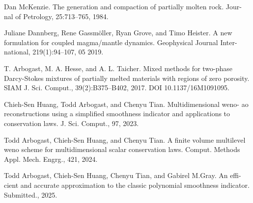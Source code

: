 \documentclass[usenames,dvipsnames,letterpaper,landscape,final]{slides}
\theoremstyle{definition}
\begin{document}
\begin{myslideNoFooter}
\small

		  \begin{nlist}

		  \item Dan McKenzie. The generation and compaction of partially molten rock. Jour-
nal of Petrology, 25:713–765, 1984.

					 \bigskip

		  \item Juliane Dannberg, Rene Gassmöller, Ryan Grove, and Timo Heister.
A new
formulation for coupled magma/mantle dynamics. Geophysical Journal Inter-
national, 219(1):94–107, 05 2019.

\bigskip
		  \item T. Arbogast, M. A. Hesse, and A. L. Taicher. Mixed methods for two-phase
Darcy-Stokes mixtures of partially melted materials with regions of zero porosity.
SIAM J. Sci. Comput., 39(2):B375–B402, 2017. DOI 10.1137/16M1091095.

\bigskip

\item Chieh-Sen Huang, Todd Arbogast, and Chenyu Tian. Multidimensional weno-
ao reconstructions using a simplified smoothness indicator and applications to
conservation laws. J. Sci. Comput., 97, 2023.

\bigskip

\item Todd Arbogast, Chieh-Sen Huang, and Chenyu Tian. A finite volume multilevel
weno scheme for multidimensional scalar conservation laws. Comput. Methods
Appl. Mech. Engrg., 421, 2024.

\bigskip

\item Todd Arbogast, Chieh-Sen Huang, Chenyu Tian, and Gabirel M.Gray. An effi-
cient and accurate approximation to the classic polynomial smoothness indicator.
Submitted., 2025.

		  \end{nlist}
\end{myslideNoFooter}
\end{document}
